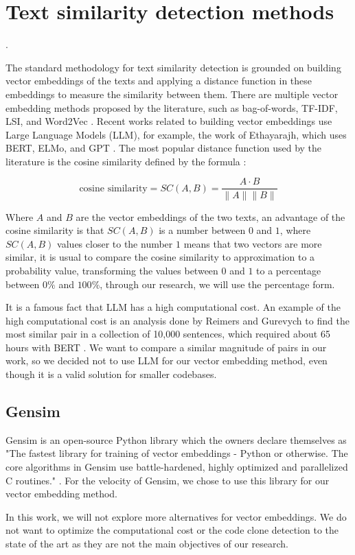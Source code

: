 \en

\section{Text similarity detection methods}
\label{sec:similarity}.

The standard methodology for text similarity detection is grounded on building vector embeddings of 
the texts and applying a distance function in these embeddings to measure the similarity between them. 
There are multiple vector embedding methods proposed by the literature, such as bag-of-words, TF-IDF, 
LSI, and Word2Vec \citep{gensimlivro}.
Recent works related to building vector embeddings use Large Language Models (LLM), for example,
the work of Ethayarajh, which uses BERT, ELMo, and GPT \citep{llmsimilar}. 
The most popular distance function used by the literature is the cosine similarity defined by the formula
\citep{cosineref}:

$$\text{cosine similarity} = SC(A,B) = \frac{ A \cdot B}{ \lVert A \rVert \lVert B \rVert }$$

Where $A$ and $B$ are the vector embeddings of the two texts, an advantage of the cosine similarity is that $SC(A,B)$ is
a number between $0$ and $1$, where $SC(A,B)$ values closer to the number $1$ means that two vectors are more similar, 
it is usual to compare the cosine similarity to approximation to a probability value, transforming the values between 
$0$ and $1$ to a percentage between $0 \% $ and $100\%$, through our research, we will use the percentage form.

It is a famous fact that LLM has a high computational cost. An example of the high computational cost is an analysis 
done by Reimers and Gurevych to find the most similar pair in a collection of 10,000 sentences, 
which required about 65 hours with BERT \citep{bertsimilar}. 
We want to compare a similar magnitude of pairs in our work, so we decided not to use LLM for our vector embedding 
method, even though it is a valid solution for smaller codebases.

\subsection{Gensim}

Gensim is an open-source Python library \citep{gensim} which the owners declare themselves as "The fastest library 
for training of vector embeddings - Python or otherwise. The core algorithms in Gensim use battle-hardened, highly 
optimized and parallelized C routines." \citep{gensimsite}. For the velocity of Gensim, we chose to use this library 
for our vector embedding method.

In this work, we will not explore more alternatives for vector embeddings. We do not want to optimize the
computational cost or the code clone detection to the state of the art as they are not the main objectives 
of our research.
